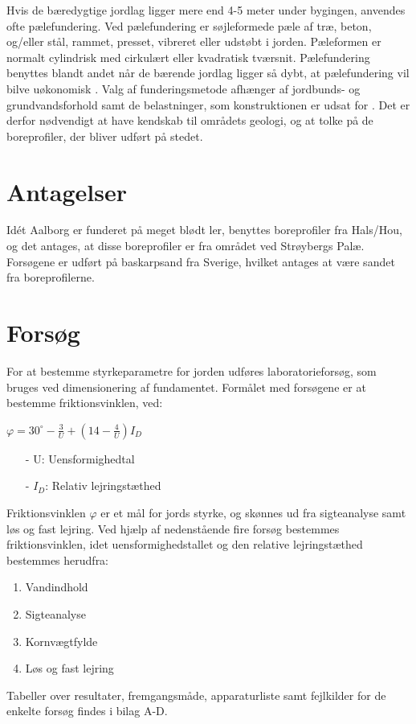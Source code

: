 \indent{     }  Hvis de bæredygtige jordlag ligger mere end 4-5 meter under bygingen, anvendes ofte pælefundering. Ved pælefundering er søjleformede pæle af træ, beton, og/eller stål, rammet, presset, vibreret eller udstøbt i jorden. Pæleformen er normalt cylindrisk med cirkulært eller kvadratisk tværsnit. Pælefundering benyttes blandt andet når de bærende jordlag ligger så dybt, at pælefundering vil bilve uøkonomisk \citep[ s. 355]{geoteknik}.
\newline
\newline
Valg af funderingsmetode afhænger af jordbunds- og grundvandsforhold samt de belastninger, som konstruktionen er udsat for \citep[ s. 355]{geoteknik}. Det er derfor nødvendigt at have kendskab til områdets geologi, og at tolke på de boreprofiler, der bliver udført på stedet. 

\section{Antagelser}
Idét Aalborg er funderet på meget blødt ler, benyttes boreprofiler fra Hals/Hou, og det antages, at disse boreprofiler er fra området ved Strøybergs Palæ. 
\newline \indent{     }  Forsøgene er udført på baskarpsand fra Sverige, hvilket antages at være sandet fra boreprofilerne.

\section{Forsøg}
For at bestemme styrkeparametre for jorden udføres laboratorieforsøg, som bruges ved dimensionering af fundamentet.
\newline
\newline
Formålet med forsøgene er at bestemme friktionsvinklen, ved: 

\begin{center}
	$\varphi = 30^\circ - \frac{3}{U} + (14 - \frac{4}{U}) I_D$
\end{center}

\begin{itemize}
	\item[-] U: Uensformighedtal
	\item[-] $I_D$: Relativ lejringstæthed
\end{itemize}

Friktionsvinklen $\varphi$ er et mål for jords styrke, og skønnes ud fra sigteanalyse samt løs og fast lejring. Ved hjælp af nedenstående fire forsøg bestemmes friktionsvinklen, idet uensformighedstallet og den relative lejringstæthed bestemmes herudfra: 
\begin{enumerate}
	\item Vandindhold
	\item Sigteanalyse
	\item Kornvægtfylde
	\item Løs og fast lejring
\end{enumerate}
Tabeller over resultater, fremgangsmåde, apparaturliste samt fejlkilder for de enkelte forsøg findes i bilag A-D.

